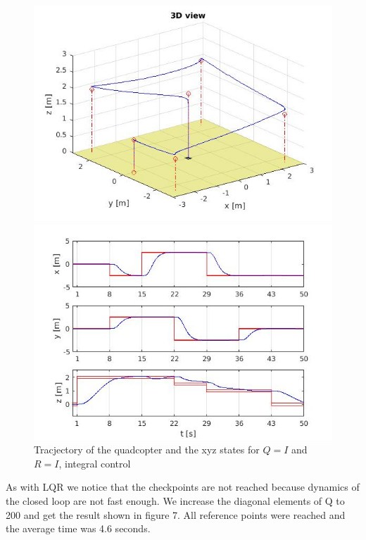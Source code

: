 \documentclass[]{article}
\begin{document}
\begin{figure}[H]
\begin{minipage}{.5\textwidth}
\includegraphics[width=\textwidth]{trajectoryi1.jpg}
\end{minipage}%
\begin{minipage}{.5\textwidth}
\includegraphics[width=\textwidth]{xyzi1.jpg}
\end{minipage}
\caption{Tracjectory of the quadcopter and the xyz states for $Q = I$ and $R = I$, integral control}
\end{figure}

As with LQR we notice that the checkpoints are not reached because dynamics of the closed loop are not fast enough. We increase the diagonal elements of Q to 200 and get the result shown in figure 7. All reference points were reached and the average time was 4.6 seconds. 
\end{document}
